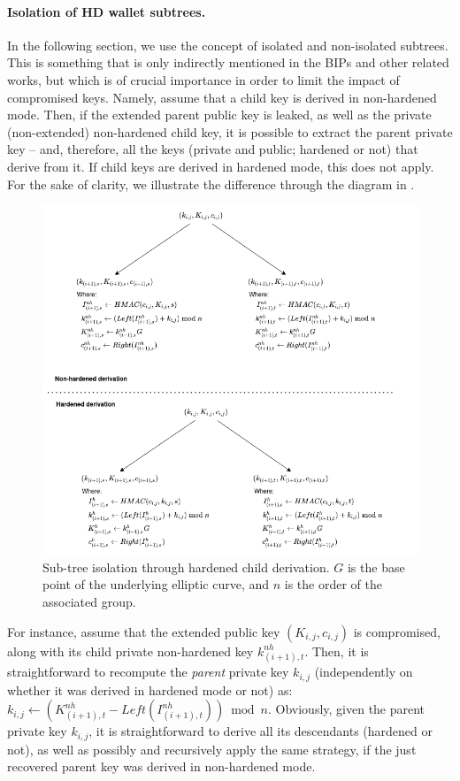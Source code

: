 \paragraph{Isolation of HD wallet subtrees.} In the following section, we use
the concept of isolated and non-isolated subtrees. This is something that is
only indirectly mentioned in the BIPs and other related works, but which is of
crucial importance in order to limit the impact of compromised keys. Namely,
assume that a child key is derived in non-hardened mode. Then, if the extended
parent public key is leaked, as well as the private (non-extended) non-hardened
child key, it is possible to extract the parent private key -- and, therefore,
all the keys (private and public; hardened or not) that derive from it. If child
keys are derived in hardened mode, this does not apply. For the sake of clarity,
we illustrate the difference through the diagram in .

\begin{figure}[ht!]
  \includegraphics[width=\textwidth]{figures/child_derivation.png}
  \caption{Sub-tree isolation through hardened child derivation. $G$ is the
    base point of the underlying elliptic curve, and $n$ is the order of
    the associated group.}
  \label{fig:isolation}
\end{figure}

For instance, assume that the extended public key $(K_{i,j}, c_{i,j})$ is
compromised, along with its child private non-hardened key $k^{nh}_{(i+1),t}$.
Then, it is straightforward  to recompute the \emph{parent} private key
$k_{i,j}$ (independently on whether it was derived in hardened mode or not) as:
$k_{i,j} \leftarrow (K_{(i+1),t}^{nh} - Left(I_{(i+1),t}^{nh})) \bmod n$.
Obviously, given the parent private key $k_{i,j}$, it is straightforward to
derive all its descendants (hardened or not), as well as possibly and
recursively apply the same strategy, if the just recovered parent key was
derived in non-hardened mode.

